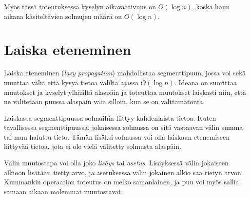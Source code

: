 \begin{center}
\end{center}
Myös tässä toteutuksessa kyselyn aikavaativuus on $O(\log n)$,
koska haun aikana käsiteltävien solmujen määrä on $O(\log n)$.

\section{Laiska eteneminen}

Laiska eteneminen (\textit{lazy propagation})
mahdollistaa segmenttipuun,
jossa voi sekä muuttaa väliä että kysyä tietoa väliltä
ajassa $O(\log n)$.
Ideana on suorittaa muutokset ja kyselyt ylhäältä
alaspäin ja toteuttaa muutokset laiskasti niin,
että ne välitetään puussa alaspäin vain silloin,
kun se on välttämätöntä.

Laiskassa segmenttipuussa solmuihin liittyy
kahdenlaista tietoa.
Kuten tavallisessa segmenttipuussa,
jokaisessa solmussa on sitä vastaavan välin
summa tai muu haluttu tieto.
Tämän lisäksi solmussa voi olla laiskaan etenemiseen
liittyvää tietoa, jota ei ole vielä välitetty
solmusta alaspäin.

Välin muutostapa voi olla joko
\textit{lisäys} tai \textit{asetus}.
Lisäyksessä välin jokaiseen alkioon lisätään
tietty arvo, ja asetuksessa välin
jokainen alkio saa tietyn arvon.
Kummankin operaation toteutus on melko samanlainen,
ja puu voi myös sallia samaan aikaan
molemmat muutostavat.

